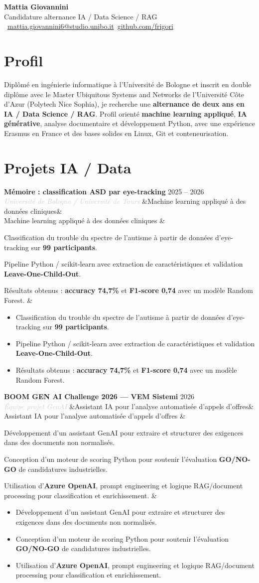 \documentclass[a4paper,10pt]{article}
\newcommand{\entrylist}[5]{%
  \noindent\textbf{#1} \hfill \textcolor{accent}{#2}\\
  \textit{\textcolor{lightgray}{#3}}%
  \ifx&#4&\else\\[-0.05em]#4\fi
  \vspace{0.15em}
  \ifx&#5&\else\begin{itemize}#5\end{itemize}\fi
  \vspace{0.1em}
}
\begin{document}
\begin{center}
  {\Huge\bfseries\color{darkgray} Mattia Giovannini}\\[0.3em]
  {\large\color{accent} Candidature alternance IA / Data Science / RAG}\\[0.45em]
  \textcolor{lightgray}{\faEnvelope\ \href{mailto:mattia.giovannini6@studio.unibo.it}{mattia.giovannini6@studio.unibo.it}\quad\textbullet\quad\faGithub\ \href{https://github.com/frigori}{github.com/frigori}}
\end{center}

\section{Profil}
Diplômé en ingénierie informatique à l'Université de Bologne et inscrit en double diplôme avec le Master Ubiquitous Systems and Networks de l'Université Côte d'Azur (Polytech Nice Sophia), je recherche une \textbf{alternance de deux ans en IA / Data Science / RAG}. Profil orienté \textbf{machine learning appliqué}, \textbf{IA générative}, analyse documentaire et développement Python, avec une expérience Erasmus en France et des bases solides en Linux, Git et conteneurisation.

\section{Projets IA / Data}

\entrylist{Mémoire : classification ASD par eye-tracking}{2025 -- 2026}{Université de Bologne / Université de Tours}{Machine learning appliqué à des données cliniques}{
  \item Classification du trouble du spectre de l'autisme à partir de données d'eye-tracking sur \textbf{99 participants}.
  \item Pipeline Python / scikit-learn avec extraction de caractéristiques et validation \textbf{Leave-One-Child-Out}.
  \item Résultats obtenus : \textbf{accuracy 74,7\%} et \textbf{F1-score 0,74} avec un modèle Random Forest.
}

\entrylist{BOOM GEN AI Challenge 2026 — VEM Sistemi}{2026}{Équipe projet GenAI}{Assistant IA pour l'analyse automatisée d'appels d'offres}{
  \item Développement d'un assistant GenAI pour extraire et structurer des exigences dans des documents non normalisés.
  \item Conception d'un moteur de scoring Python pour soutenir l'évaluation \textbf{GO/NO-GO} de candidatures industrielles.
  \item Utilisation d'\textbf{Azure OpenAI}, prompt engineering et logique RAG/document processing pour classification et enrichissement.
}
\end{document}
